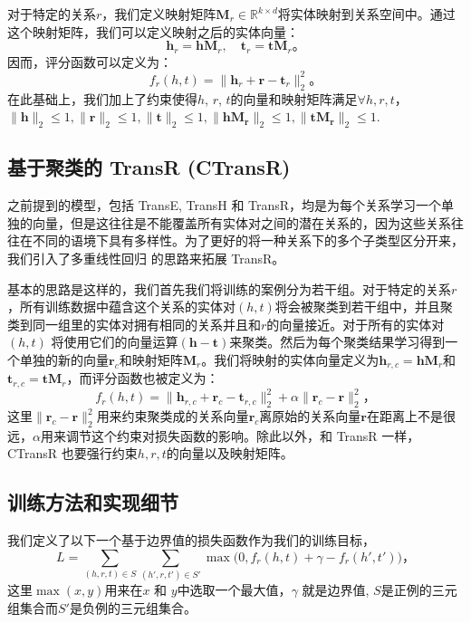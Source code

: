     对于特定的关系$r$，我们定义映射矩阵$\mathbf{M}_{r} \in \mathbb{R}^{k \times d}$将实体映射到关系空间中。通过这个映射矩阵，我们可以定义映射之后的实体向量：
    \begin{equation}
    \mathbf{h}_{r} = \mathbf{h}\mathbf{M}_r, \quad \mathbf{t}_{r} = \mathbf{t}\mathbf{M}_r。
    \end{equation}
    因而，评分函数可以定义为：
    \begin{equation}
    f_{r}(h, t) = \|\mathbf{h}_r + \mathbf{r} - \mathbf{t}_r\|_{2}^{2}。
    \end{equation}
    在此基础上，我们加上了约束使得$h$, $r$, $t$的向量和映射矩阵满足$\forall h, r, t$，$\|\mathbf{h}\|_2\le1,\|\mathbf{r}\|_2\le1, \|\mathbf{t}\|_2\le1, \|\mathbf{h}\mathbf{M_r}\|_2\le1, \|\mathbf{t}\mathbf{M_r}\|_2\le1$.

    \subsection{基于聚类的 TransR (CTransR)}
    之前提到的模型，包括 TransE, TransH 和 TransR，均是为每个关系学习一个单独的向量，但是这往往是不能覆盖所有实体对之间的潜在关系的，因为这些关系往往在不同的语境下具有多样性。为了更好的将一种关系下的多个子类型区分开来，我们引入了多重线性回归  的思路来拓展 TransR。

    基本的思路是这样的，我们首先我们将训练的案例分为若干组。对于特定的关系$r$，所有训练数据中蕴含这个关系的实体对$(h, t)$将会被聚类到若干组中，并且聚类到同一组里的实体对拥有相同的关系并且和$r$的向量接近。对于所有的实体对$(h, t)$ 将使用它们的向量运算$(\mathbf{h} - \mathbf{t})$来聚类。然后为每个聚类结果学习得到一个单独的新的向量$\mathbf{r}_c$和映射矩阵$\mathbf{M}_{r}$。我们将映射的实体向量定义为$\mathbf{h}_{r,c} = \mathbf{h}\mathbf{M}_{r}$和$\mathbf{t}_{r,c} = \mathbf{t}\mathbf{M}_{r}$，而评分函数也被定义为：
    \begin{equation}
    f_{r}(h, t) = \|\mathbf{h}_{r, c} + \mathbf{r}_c - \mathbf{t}_{r, c}\|_{2}^{2} + \alpha \|\mathbf{r}_{c} - \mathbf{r}\|_{2}^{2}，
    \end{equation}
    这里$\|\mathbf{r}_{c} - \mathbf{r}\|_{2}^{2}$用来约束聚类成的关系向量$\mathbf{r}_{c}$离原始的关系向量$\mathbf{r}$在距离上不是很远，$\alpha$用来调节这个约束对损失函数的影响。除此以外，和 TransR 一样，CTransR 也要强行约束$h, r, t$的向量以及映射矩阵。

    \subsection{训练方法和实现细节}
    我们定义了以下一个基于边界值的损失函数作为我们的训练目标，
    \begin{equation}
    L = \sum_{(h, r, t) \in S}\sum_{(h', r, t') \in S'}\max \big( 0, f_r(h, t) + \gamma - f_r(h', t')\big)，
    \end{equation}
    这里$\max(x,y)$用来在$x$ 和 $y$中选取一个最大值，$\gamma$ 就是边界值, $S$是正例的三元组集合而$S'$是负例的三元组集合。

